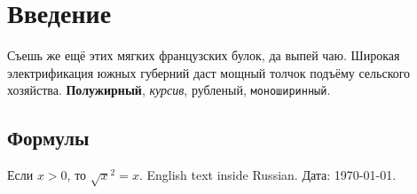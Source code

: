 \documentclass{article}
\begin{document}
\section{Введение}
Съешь же ещё этих мягких французских булок, да выпей чаю. Широкая электрификация
южных губерний даст мощный толчок подъёму сельского хозяйства.
\textbf{Полужирный}, \textit{курсив}, \textsf{рубленый}, \texttt{моноширинный}.
\subsection{Формулы}
Если $x>0$, то $\sqrt{x}^2 = x$. \textenglish{English text inside Russian.}
Дата: \today.
\end{document}
